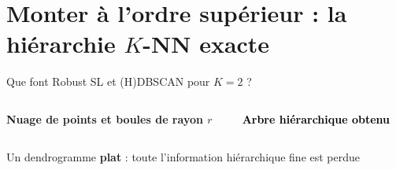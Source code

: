 \section{\texorpdfstring{Monter à l'\textcolor{inria-rouge}{ordre supérieur} : la hiérarchie $K$-NN exacte}{Monter à l'ordre supérieur : la hiérarchie K-NN exacte}}
\begin{frame}[label=bk-ordre]
    \sectionpage
\end{frame}

\begin{frame}{Que font Robust SL et (H)DBSCAN pour $K = 2$ ?}
    \begin{columns}[c, onlytextwidth]
        \begin{column}{0.52\textwidth}
            \begin{center}
                \textbf{Nuage de points et boules de rayon $r$}

                \vspace{0.4cm}
                
            \end{center}
        \end{column}

        \begin{column}{0.44\textwidth}
            \begin{center}
                \textcolor{black}{\textbf{Arbre hiérarchique obtenu}}

                \vspace{0.4cm}
                
            \end{center}
        \end{column}
    \end{columns}
    \vspace{0.3cm}
    \begin{center}
        \small Un dendrogramme \textbf{plat} : toute l'information hiérarchique fine est perdue
    \end{center}
\end{frame}

